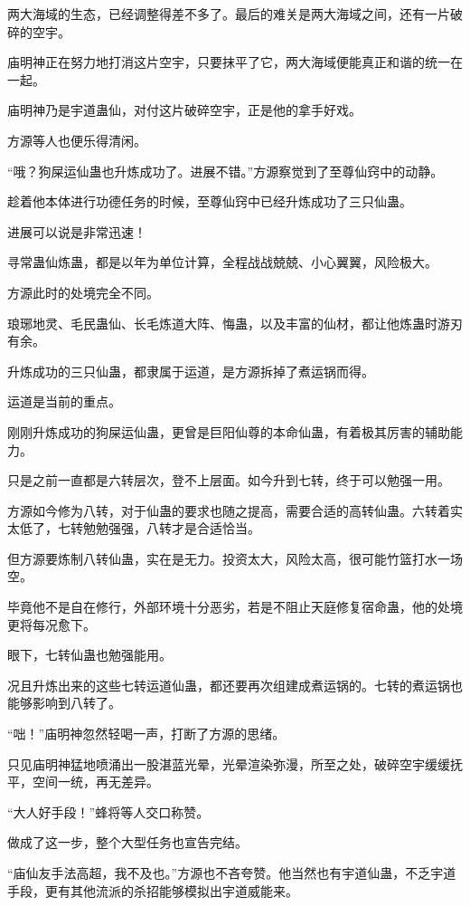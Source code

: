\begin{this_body}
两大海域的生态，已经调整得差不多了。最后的难关是两大海域之间，还有一片破碎的空宇。

庙明神正在努力地打消这片空宇，只要抹平了它，两大海域便能真正和谐的统一在一起。

庙明神乃是宇道蛊仙，对付这片破碎空宇，正是他的拿手好戏。

方源等人也便乐得清闲。

“哦？狗屎运仙蛊也升炼成功了。进展不错。”方源察觉到了至尊仙窍中的动静。

趁着他本体进行功德任务的时候，至尊仙窍中已经升炼成功了三只仙蛊。

进展可以说是非常迅速！

寻常蛊仙炼蛊，都是以年为单位计算，全程战战兢兢、小心翼翼，风险极大。

方源此时的处境完全不同。

琅琊地灵、毛民蛊仙、长毛炼道大阵、悔蛊，以及丰富的仙材，都让他炼蛊时游刃有余。

升炼成功的三只仙蛊，都隶属于运道，是方源拆掉了煮运锅而得。

运道是当前的重点。

刚刚升炼成功的狗屎运仙蛊，更曾是巨阳仙尊的本命仙蛊，有着极其厉害的辅助能力。

只是之前一直都是六转层次，登不上层面。如今升到七转，终于可以勉强一用。

方源如今修为八转，对于仙蛊的要求也随之提高，需要合适的高转仙蛊。六转着实太低了，七转勉勉强强，八转才是合适恰当。

但方源要炼制八转仙蛊，实在是无力。投资太大，风险太高，很可能竹篮打水一场空。

毕竟他不是自在修行，外部环境十分恶劣，若是不阻止天庭修复宿命蛊，他的处境更将每况愈下。

眼下，七转仙蛊也勉强能用。

况且升炼出来的这些七转运道仙蛊，都还要再次组建成煮运锅的。七转的煮运锅也能够影响到八转了。

“咄！”庙明神忽然轻喝一声，打断了方源的思绪。

只见庙明神猛地喷涌出一股湛蓝光晕，光晕渲染弥漫，所至之处，破碎空宇缓缓抚平，空间一统，再无差异。

“大人好手段！”蜂将等人交口称赞。

做成了这一步，整个大型任务也宣告完结。

“庙仙友手法高超，我不及也。”方源也不吝夸赞。他当然也有宇道仙蛊，不乏宇道手段，更有其他流派的杀招能够模拟出宇道威能来。


\end{this_body}
